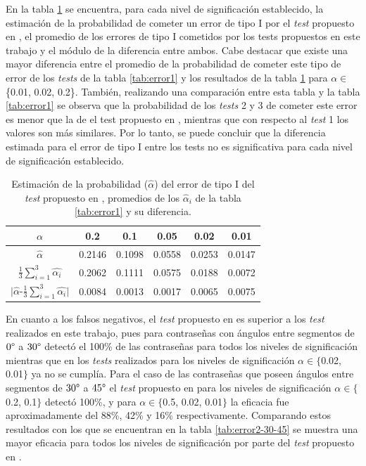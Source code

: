 \documentclass[12pt]{report}
\begin{document}
En la tabla \ref{tab:erro1-sensor} se encuentra, para cada nivel de significación establecido, la estimación de la probabilidad de cometer un error de tipo I por el \textit{test} propuesto en \cite{13}, el promedio de los errores de tipo I cometidos por los tests propuestos en este trabajo y el módulo de la diferencia entre ambos. 
Cabe destacar que existe una mayor diferencia entre el promedio de la probabilidad de cometer este tipo de error de los \textit{tests} de la tabla \ref{tab:error1} y los resultados de la tabla \ref{tab:erro1-sensor} para $\alpha \in$\{0.01, 0.02, 0.2\}. También, realizando una comparación entre esta tabla y la tabla \ref{tab:error1} se observa que la probabilidad de los \textit{tests} 2 y 3 de cometer este error es menor que la de el test propuesto en \cite{13}, mientras que con respecto al \textit{test} 1 los valores son más similares.
Por lo tanto, se puede concluir que la diferencia estimada para el error de tipo I entre los tests no es significativa para cada nivel de significación establecido.
\begin{table}[h!]
	\centering
	\begin{tabular}{|c|ccccc|}
		\hline
		$\alpha$ &  0.2 & 0.1 & 0.05 & 0.02 & 0.01 \\
		\hline
		$\hat{\alpha}$ & 0.2146 & 0.1098 & 0.0558 & 0.0253 & 0.0147 \\
		$\frac{1}{3} \sum_{i=1}^{3} \hat{\alpha_i}$		
		&0.2062	&	0.1111	&	0.0575	&	0.0188	&0.0072	\\	
		\hline
		$|\hat{\alpha}$-$\frac{1}{3} \sum_{i=1}^{3} \hat{\alpha_i}|$ & 0.0084  & 0.0013 &  0.0017 &0.0065  &  0.0075 \\
		\hline
	\end{tabular}
	\caption{Estimación de la probabilidad ($\hat{\alpha}$) del error de tipo I del \textit{test} propuesto en \cite{13}, promedios de los $\hat{\alpha}_i$ de la tabla \ref{tab:error1} y su diferencia.}
	\label{tab:erro1-sensor}
\end{table}

En cuanto a los falsos negativos, el \textit{test} propuesto en \cite{13} es superior a los \textit{test} realizados en este trabajo, pues para contraseñas con ángulos entre segmentos de  $0\degree$ a $30\degree$ detectó el 100\% de las contraseñas para todos los niveles de significación mientras que en los \textit{tests} realizados para los niveles de significación  $\alpha \in \{$0.02, 0.01$\}$ ya no se cumplía. Para el caso de las contraseñas que poseen ángulos entre segmentos de $30\degree$ a $45\degree$ el \textit{test} propuesto en \cite{13} para los niveles de significación $\alpha \in \{$0.2, 0.1$\}$ detectó 100\%, y para $\alpha \in \{$0.5, 0.02, 0.01$\}$ la eficacia fue aproximadamente  del 88\%, 42\% y 16\% respectivamente. Comparando estos resultados con los que se encuentran en la tabla \ref{tab:error2-30-45} se muestra una mayor eficacia para todos los niveles de significación por parte del \textit{test} propuesto en \cite{13}.
\end{document}
